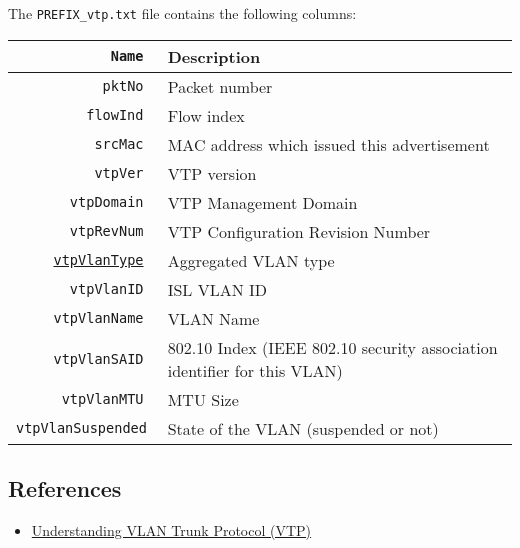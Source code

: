 \documentclass[documentation]{subfiles}
\begin{document}
The {\tt PREFIX\_vtp.txt} file contains the following columns:
\begin{longtable}{>{\tt}rl}
    \toprule
    {\bf Name} & {\bf Description}\\
    \midrule\endhead%
    pktNo                               & Packet number\\
    flowInd                             & Flow index\\
    srcMac                              & MAC address which issued this advertisement\\
    vtpVer                              & VTP version\\
    vtpDomain                           & VTP Management Domain\\
    vtpRevNum                           & VTP Configuration Revision Number\\
    \hyperref[vtpVlanType]{vtpVlanType} & Aggregated VLAN type\\
    vtpVlanID                           & ISL VLAN ID\\
    vtpVlanName                         & VLAN Name\\
    vtpVlanSAID                         & 802.10 Index (IEEE 802.10 security association identifier for this VLAN)\\
    vtpVlanMTU                          & MTU Size\\
    vtpVlanSuspended                    & State of the VLAN (suspended or not)\\
    \bottomrule
\end{longtable}

\subsection{References}
\begin{itemize}
    \item \href{http://www.cisco.com/en/US/tech/tk389/tk689/technologies_tech_note09186a0080094c52.shtml}{Understanding VLAN Trunk Protocol (VTP)}
\end{itemize}
\end{document}
